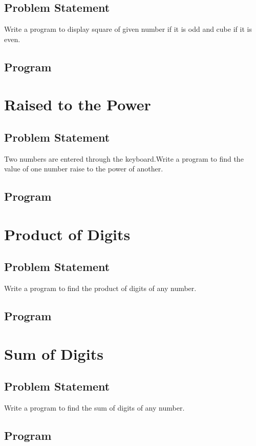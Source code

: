 \documentclass[11pt]{report}
\begin{document}
\section{Problem Statement}
Write a program to display square of given number if it is odd and cube if it is even.
\section{Program}

        
\chapter{Raised to the Power}
\section{Problem Statement}
Two numbers are entered through the keyboard.Write a program to find the value of one number raise to the power of another.
\section{Program}


\chapter{Product of Digits}
\section{Problem Statement}
Write a program to find the product of digits of any number.
\section{Program}


\chapter{Sum of Digits}
\section{Problem Statement}
Write a program to find the sum of digits of any number.
\section{Program}

\end{document}
